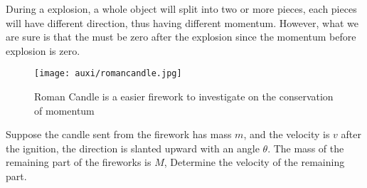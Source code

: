 \documentclass[a4paper]{tufte-handout}
\newenvironment{TaskBox} %
{\begin{tcolorbox}[breakable,colback=b1!30,colframe=b1,title=Task]} {\end{tcolorbox}}
\begin{document}
During a explosion, a whole object will split into two or more pieces, each pieces will have different direction, thus having different momentum. However, what we are sure is that the  must be zero after the explosion since the momentum before explosion is zero.
\begin{figure}
\texttt{[image: auxi/romancandle.jpg]}
\caption{Roman Candle is a easier firework to investigate on the conservation of momentum}
\end{figure}

\begin{TaskBox}
Suppose the candle sent from the firework has mass $m$, and the velocity is $v$ after the ignition, the direction is slanted upward with an angle $\theta$. The mass of the remaining part of the fireworks is $M$, Determine the velocity of the remaining part.
\vspace{3in}
\end{TaskBox}
\end{document}
